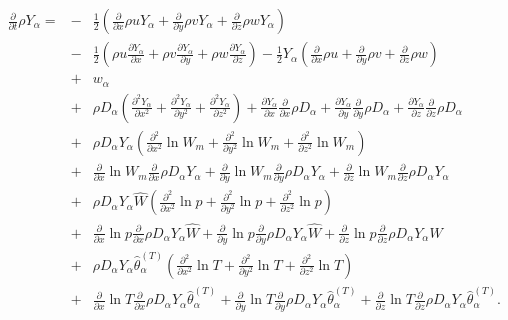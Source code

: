 \documentclass[dvips]{article}
\begin{document}
\begin{eqnarray}
\frac{\partial}{\partial t}\rho Y_{\alpha} =
& - & \frac{1}{2}\left(
 \frac{\partial}{\partial x}\rho u Y_{\alpha} 
+\frac{\partial}{\partial y}\rho v Y_{\alpha} 
+\frac{\partial}{\partial z}\rho w Y_{\alpha}
                 \right) \nonumber\\
& - & \frac{1}{2}\left(
 \rho u\frac{\partial Y_{\alpha}}{\partial x}
+\rho v\frac{\partial Y_{\alpha}}{\partial y}
+\rho w\frac{\partial Y_{\alpha}}{\partial z}
                 \right)
-\frac{1}{2}Y_{\alpha}\left(
 \frac{\partial}{\partial x}\rho u
+\frac{\partial}{\partial y}\rho v
+\frac{\partial}{\partial z}\rho w
             \right) \nonumber\\
& + & w_{\alpha}\nonumber\\
& + & \rho D_{\alpha}
\left(
 \frac{\partial^{2} Y_{\alpha}}{\partial x^{2}}
+\frac{\partial^{2} Y_{\alpha}}{\partial y^{2}}
+\frac{\partial^{2} Y_{\alpha}}{\partial z^{2}}
\right)
+\frac{\partial Y_{\alpha}}{\partial x}
 \frac{\partial}{\partial x}\rho D_{\alpha}
+\frac{\partial Y_{\alpha}}{\partial y}
 \frac{\partial}{\partial y}\rho D_{\alpha}
+\frac{\partial Y_{\alpha}}{\partial z}
 \frac{\partial}{\partial z}\rho D_{\alpha} \nonumber\\
& + & \rho D_{\alpha}Y_{\alpha}
\left(
 \frac{\partial^{2}}{\partial x^{2}}\ln{W_{m}}
+\frac{\partial^{2}}{\partial y^{2}}\ln{W_{m}}
+\frac{\partial^{2}}{\partial z^{2}}\ln{W_{m}}
\right) \nonumber\\
& + &
\frac{\partial}{\partial x}\ln{W_{m}}
 \frac{\partial}{\partial x}\rho D_{\alpha}Y_{\alpha}
+\frac{\partial}{\partial y}\ln{W_{m}}
 \frac{\partial}{\partial y}\rho D_{\alpha}Y_{\alpha}
+\frac{\partial}{\partial z}\ln{W_{m}}
 \frac{\partial}{\partial z}\rho D_{\alpha}Y_{\alpha} \nonumber\\
& + & \rho D_{\alpha}Y_{\alpha}\hat{W}
\left(
 \frac{\partial^{2}}{\partial x^{2}}\ln{p}
+\frac{\partial^{2}}{\partial y^{2}}\ln{p}
+\frac{\partial^{2}}{\partial z^{2}}\ln{p}
\right) \nonumber\\
& + &
\frac{\partial}{\partial x}\ln{p}
 \frac{\partial}{\partial x}\rho D_{\alpha}Y_{\alpha}\hat{W}
+\frac{\partial}{\partial y}\ln{p}
 \frac{\partial}{\partial y}\rho D_{\alpha}Y_{\alpha}\hat{W}
+\frac{\partial}{\partial z}\ln{p}
 \frac{\partial}{\partial z}\rho D_{\alpha}Y_{\alpha}\hat{W}
\nonumber\\
& + & \rho D_{\alpha}Y_{\alpha}\hat{\theta}_{\alpha}^{(T)}
\left(
 \frac{\partial^{2}}{\partial x^{2}}\ln{T}
+\frac{\partial^{2}}{\partial y^{2}}\ln{T}
+\frac{\partial^{2}}{\partial z^{2}}\ln{T}
\right) \nonumber\\
& + &
\frac{\partial}{\partial x}\ln{T}
 \frac{\partial}{\partial x}\rho D_{\alpha}
Y_{\alpha}\hat{\theta}_{\alpha}^{(T)}
+\frac{\partial}{\partial y}\ln{T}
 \frac{\partial}{\partial y}\rho D_{\alpha}
Y_{\alpha}\hat{\theta}_{\alpha}^{(T)}
+\frac{\partial}{\partial z}\ln{T}
 \frac{\partial}{\partial z}\rho D_{\alpha}
Y_{\alpha}\hat{\theta}_{\alpha}^{(T)}.
\label{EMASSFRACMAV}
\end{eqnarray}
\end{document}
